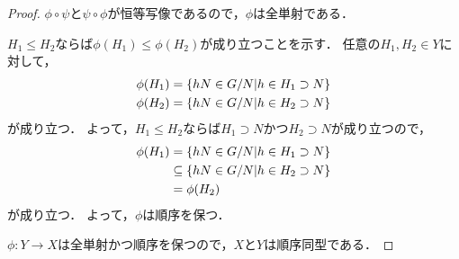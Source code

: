 \begin{proof}
    $\phi\circ\psi$と$\psi\circ\phi$が恒等写像であるので，$\phi$は全単射である．

    $H_1 \leq H_2$ならば$\phi(H_1) \leq \phi(H_2)$が成り立つことを示す．
    任意の$H_1,H_2\in Y$に対して，
    \begin{align}
        \phi(H_1) &= \left\{hN \in G/N | h \in H_1 \supset N\right\} \notag\\
        \phi(H_2) &= \left\{hN \in G/N | h \in H_2 \supset N\right\} \notag
    \end{align}
    が成り立つ．
    よって，$H_1 \leq H_2$ならば$H_1 \supset N$かつ$H_2 \supset N$が成り立つので，
    \begin{align}
        \phi(H_1) &= \left\{hN \in G/N | h \in H_1 \supset N\right\} \notag\\
        &\subseteq \left\{hN \in G/N | h \in H_2 \supset N\right\} \notag\\
        &= \phi(H_2) \notag
    \end{align}
    が成り立つ．
    よって，$\phi$は順序を保つ．

    $\phi : Y \to X$は全単射かつ順序を保つので，$X$と$Y$は順序同型である．

 
\end{proof}